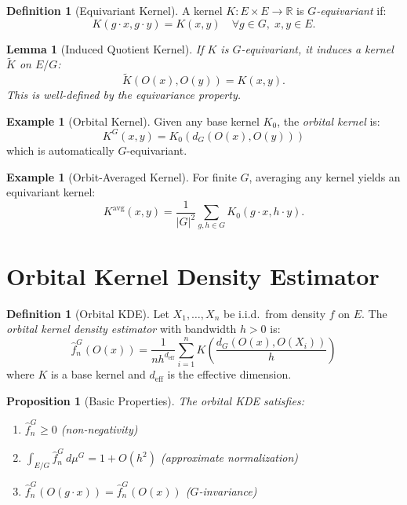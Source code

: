 \documentclass[11pt,twoside,openright]{book}
\theoremstyle{plain}
\newtheorem{lemma}[theorem]{Lemma}
\newtheorem{proposition}[theorem]{Proposition}
\theoremstyle{definition}
\newtheorem{definition}[theorem]{Definition}
\newtheorem{example}[theorem]{Example}
\theoremstyle{remark}
\newcommand{\Rd}{\mathbb{R}}
\newcommand{\deff}{d_{\mathrm{eff}}}
\begin{document}
\begin{definition}[Equivariant Kernel]
A kernel $K : E \times E \to \Rd$ is \emph{$G$-equivariant} if:
\[
K(g \cdot x, g \cdot y) = K(x, y) \quad \forall g \in G, \; x, y \in E.
\]
\end{definition}

\begin{lemma}[Induced Quotient Kernel]
\label{lem:quotient-kernel}
If $K$ is $G$-equivariant, it induces a kernel $\tilde{K}$ on $E/G$:
\[
\tilde{K}(O(x), O(y)) = K(x, y).
\]
This is well-defined by the equivariance property.
\end{lemma}

\begin{example}[Orbital Kernel]
Given any base kernel $K_0$, the \emph{orbital kernel} is:
\[
K^G(x, y) = K_0(d_G(O(x), O(y)))
\]
which is automatically $G$-equivariant.
\end{example}

\begin{example}[Orbit-Averaged Kernel]
For finite $G$, averaging any kernel yields an equivariant kernel:
\[
K^{\text{avg}}(x, y) = \frac{1}{|G|^2} \sum_{g, h \in G} K_0(g \cdot x, h \cdot y).
\]
\end{example}

\section{Orbital Kernel Density Estimator}

\begin{definition}[Orbital KDE]
Let $X_1, \ldots, X_n$ be i.i.d.\ from density $f$ on $E$. The \emph{orbital kernel density estimator} with bandwidth $h > 0$ is:
\begin{equation}
\hat{f}_n^G(O(x)) = \frac{1}{nh^{\deff}} \sum_{i=1}^n K\left(\frac{d_G(O(x), O(X_i))}{h}\right)
\label{eq:orbital-kde}
\end{equation}
where $K$ is a base kernel and $\deff$ is the effective dimension.
\end{definition}

\begin{proposition}[Basic Properties]
The orbital KDE satisfies:
\begin{enumerate}[label=(\roman*)]
\item $\hat{f}_n^G \geq 0$ (non-negativity)
\item $\int_{E/G} \hat{f}_n^G \, d\mu^G = 1 + O(h^2)$ (approximate normalization)
\item $\hat{f}_n^G(O(g \cdot x)) = \hat{f}_n^G(O(x))$ ($G$-invariance)
\end{enumerate}
\end{proposition}
\end{document}
